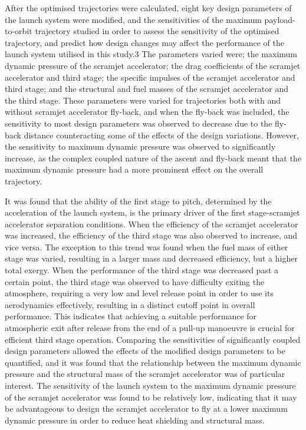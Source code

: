 After the optimised trajectories were calculated, eight key design parameters of the launch system were modified, and the sensitivities of the maximum payload-to-orbit trajectory studied in order to assess the sensitivity of the optimised trajectory, and predict how design changes may affect the performance of the launch system utilised in this study.3
The parameters varied were; the maximum dynamic pressure of the scramjet accelerator; the drag coefficients of the scramjet accelerator and third stage; the specific impulses of the scramjet accelerator and third stage; and the structural and fuel masses of the scramjet accelerator and the third stage. 
These parameters were varied for trajectories both with and without scramjet accelerator fly-back, and when the fly-back was included, the sensitivity to most design parameters was observed to decrease due to the fly-back distance counteracting some of the effects of the design variations. However, the sensitivity to maximum dynamic pressure was observed to significantly increase, as the complex coupled nature of the ascent and fly-back meant that the maximum dynamic pressure had a more prominent effect on the overall trajectory. 

It was found that the ability of the first stage to pitch, determined by the acceleration of the launch system, is the primary driver of the first stage-scramjet accelerator separation conditions. 
When the efficiency of the scramjet accelerator was increased, the efficiency of the third stage was also observed to increase, and vice versa. The exception to this trend was found when the fuel mass of either stage was varied, resulting in a larger mass and decreased efficiency, but a higher total exergy.
When the performance of the third stage was decreased past a certain point, the third stage was observed to have difficulty exiting the atmosphere, requiring a very low and level release point in order to use its aerodynamics effectively, resulting in a distinct cutoff point in overall performance. This indicates that achieving a suitable performance for atmospheric exit after release from the end of a pull-up manoeuvre is crucial for efficient third stage operation.  
Comparing the sensitivities of significantly coupled design parameters allowed the effects of the modified design parameters to be quantified, and it was found that the relationship between the maximum dynamic pressure and the structural mass of the scramjet accelerator was of particular interest. 
The sensitivity of the launch system to the maximum dynamic pressure of the scramjet accelerator was found to be relatively low, indicating that it may be advantageous to design the scramjet accelerator to fly at a lower maximum dynamic pressure in order to reduce heat shielding and structural mass. 

